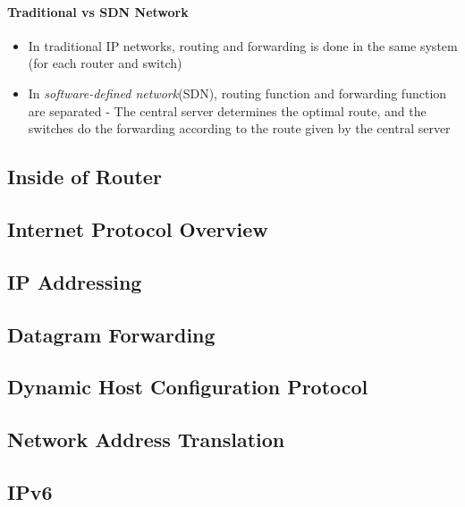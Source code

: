 \paragraph{Traditional vs SDN Network}
\begin{itemize}
	\item In traditional IP networks, routing and forwarding is done in the same system (for each router and switch)
	\item In \textit{software-defined network}(SDN), routing function and forwarding function are separated - The central server determines the optimal route, and the switches do the forwarding according to the route given by the central server 
\end{itemize}

\newpage
\subsection{Inside of Router}

\subsection{Internet Protocol Overview}

\subsection{IP Addressing}

\subsection{Datagram Forwarding}

\subsection{Dynamic Host Configuration Protocol}

\subsection{Network Address Translation}

\subsection{IPv6}
